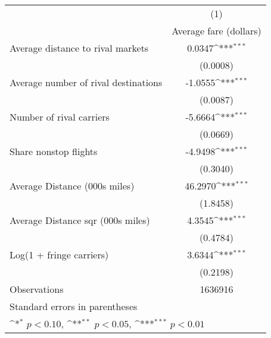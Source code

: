 {
\def\sym#1{\ifmmode^{#1}\else\(^{#1}\)\fi}
\begin{tabular}{l*{1}{c}}
\toprule
                    &\multicolumn{1}{c}{(1)}\\
                    &\multicolumn{1}{c}{Average fare (dollars)}\\
\midrule
Average distance to rival markets&      0.0347\sym{***}\\
                    &    (0.0008)         \\
\addlinespace
Average number of rival destinations&     -1.0555\sym{***}\\
                    &    (0.0087)         \\
\addlinespace
Number of rival carriers&     -5.6664\sym{***}\\
                    &    (0.0669)         \\
\addlinespace
Share nonstop flights &     -4.9498\sym{***}\\
                    &    (0.3040)         \\
\addlinespace
Average Distance (000s miles)&     46.2970\sym{***}\\
                    &    (1.8458)         \\
\addlinespace
Average Distance sqr (000s miles)&      4.3545\sym{***}\\
                    &    (0.4784)         \\
\addlinespace
Log(1 + fringe carriers)&      3.6344\sym{***}\\
                    &    (0.2198)         \\
\midrule
Observations        &     1636916         \\
\bottomrule
\multicolumn{2}{l}{\footnotesize Standard errors in parentheses}\\
\multicolumn{2}{l}{\footnotesize \sym{*} \(p<0.10\), \sym{**} \(p<0.05\), \sym{***} \(p<0.01\)}\\
\end{tabular}
}
